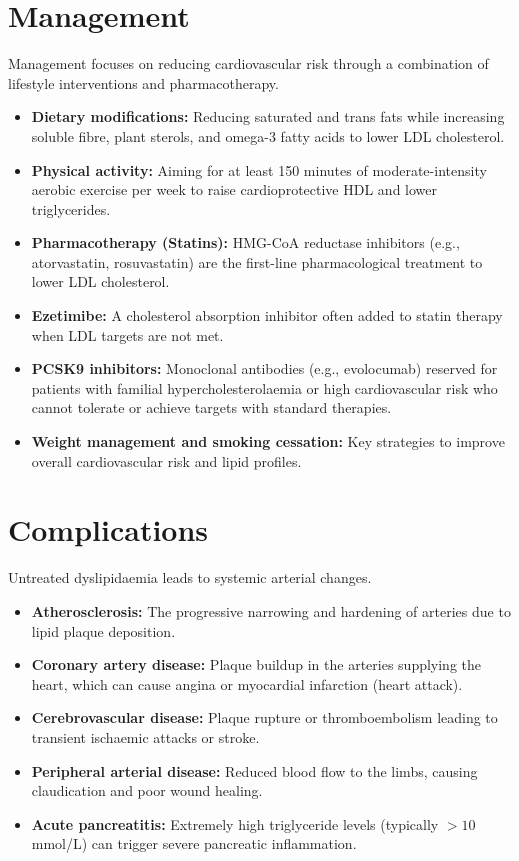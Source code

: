 \section*{Management}
Management focuses on reducing cardiovascular risk through a combination of lifestyle interventions and pharmacotherapy.
\begin{itemize}
    \item \textbf{Dietary modifications:} Reducing saturated and trans fats while increasing soluble fibre, plant sterols, and omega-3 fatty acids to lower LDL cholesterol.
    \item \textbf{Physical activity:} Aiming for at least 150 minutes of moderate-intensity aerobic exercise per week to raise cardioprotective HDL and lower triglycerides.
    \item \textbf{Pharmacotherapy (Statins):} HMG-CoA reductase inhibitors (e.g., atorvastatin, rosuvastatin) are the first-line pharmacological treatment to lower LDL cholesterol.
    \item \textbf{Ezetimibe:} A cholesterol absorption inhibitor often added to statin therapy when LDL targets are not met.
    \item \textbf{PCSK9 inhibitors:} Monoclonal antibodies (e.g., evolocumab) reserved for patients with familial hypercholesterolaemia or high cardiovascular risk who cannot tolerate or achieve targets with standard therapies.
    \item \textbf{Weight management and smoking cessation:} Key strategies to improve overall cardiovascular risk and lipid profiles.
\end{itemize}

\section*{Complications}
Untreated dyslipidaemia leads to systemic arterial changes.
\begin{itemize}
    \item \textbf{Atherosclerosis:} The progressive narrowing and hardening of arteries due to lipid plaque deposition.
    \item \textbf{Coronary artery disease:} Plaque buildup in the arteries supplying the heart, which can cause angina or myocardial infarction (heart attack).
    \item \textbf{Cerebrovascular disease:} Plaque rupture or thromboembolism leading to transient ischaemic attacks or stroke.
    \item \textbf{Peripheral arterial disease:} Reduced blood flow to the limbs, causing claudication and poor wound healing.
    \item \textbf{Acute pancreatitis:} Extremely high triglyceride levels (typically $>10$\,mmol/L) can trigger severe pancreatic inflammation.
\end{itemize}


